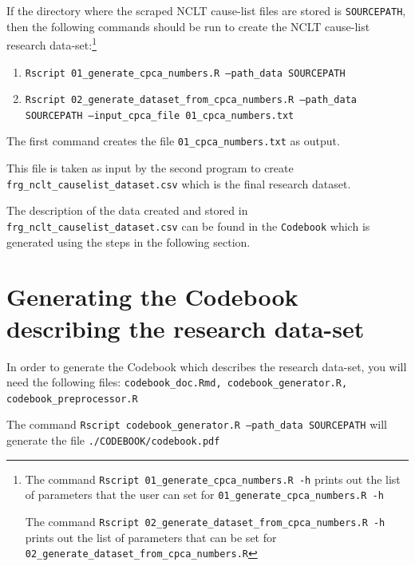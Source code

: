 \documentclass[12pt,a4paper]{article}
\let\rmarkdownfootnote\footnote%
\def\footnote{\protect\rmarkdownfootnote}
\begin{document}
If the directory where the scraped NCLT cause-list files are stored is
\texttt{SOURCEPATH}, then the following commands should be run to
create the NCLT cause-list research data-set:\footnote{The command
  \texttt{Rscript 01\_generate\_cpca\_numbers.R -h} prints out the
  list of parameters that the user can set for
  \texttt{01\_generate\_cpca\_numbers.R -h}

  The command \texttt{Rscript
    02\_generate\_dataset\_from\_cpca\_numbers.R -h} prints out the
  list of parameters that can be set for
  \texttt{02\_generate\_dataset\_from\_cpca\_numbers.R} }
\begin{enumerate}
\item \texttt{Rscript 01\_generate\_cpca\_numbers.R --path\_data
    SOURCEPATH}
\item \texttt{Rscript 02\_generate\_dataset\_from\_cpca\_numbers.R
    --path\_data SOURCEPATH --input\_cpca\_file 01\_cpca\_numbers.txt}
\end{enumerate}

The first command creates the file \texttt{01\_cpca\_numbers.txt} as
output.

This file is taken as input by the second program to create
\texttt{frg\_nclt\_causelist\_dataset.csv} which is the final research
dataset.

The description of the data created and stored in
\texttt{frg\_nclt\_causelist\_dataset.csv} can be found in the
\texttt{Codebook} which is generated using the steps in the following
section.



\section{Generating the Codebook describing the research data-set}

In order to generate the Codebook which describes the research
data-set, you will need the following files:
\texttt{codebook\_doc.Rmd, codebook\_generator.R,
  codebook\_preprocessor.R}

The command \texttt{Rscript codebook\_generator.R --path\_data
  SOURCEPATH} will generate the file \texttt{./CODEBOOK/codebook.pdf}
\end{document}
